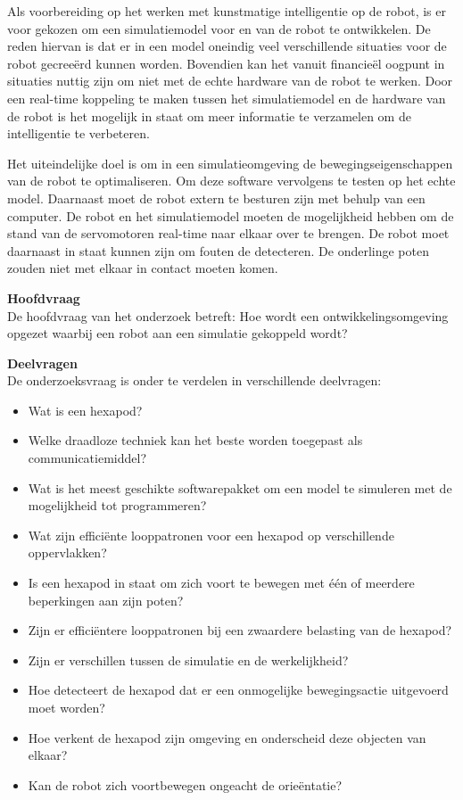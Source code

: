 \documentclass[10pt,a4paper]{article}
\begin{document}
Als voorbereiding op het werken met kunstmatige intelligentie op de robot, is er voor gekozen om een simulatiemodel voor en van de robot te ontwikkelen. De reden hiervan is dat er in een model oneindig veel verschillende situaties voor de robot gecree\"erd kunnen worden. Bovendien kan het vanuit financie\"el oogpunt in situaties nuttig zijn om niet met de echte hardware van de robot te werken. 
Door een real-time koppeling te maken tussen het simulatiemodel en de hardware van de robot is het mogelijk in staat om meer informatie te verzamelen om de intelligentie te verbeteren.

Het uiteindelijke doel is om in een simulatieomgeving de bewegingseigenschappen van de robot te optimaliseren. Om deze software vervolgens te testen op het echte model. Daarnaast moet de robot extern te besturen zijn met behulp van een computer. De robot en het simulatiemodel moeten de mogelijkheid hebben om de stand van de servomotoren real-time naar elkaar over te brengen. De robot moet daarnaast in staat kunnen zijn om fouten de detecteren. De onderlinge poten zouden niet met elkaar in contact moeten komen.

\textbf{Hoofdvraag\\}
De hoofdvraag van het onderzoek betreft:
Hoe wordt een ontwikkelingsomgeving opgezet waarbij een robot aan een simulatie gekoppeld wordt?

\textbf{Deelvragen\\}
De onderzoeksvraag is onder te verdelen in verschillende deelvragen:
\begin{itemize}
\setlength\itemsep{0em}
\item Wat is een hexapod?
\item Welke draadloze techniek kan het beste worden toegepast als communicatiemiddel?
\item Wat is het meest geschikte softwarepakket om een model te simuleren met de mogelijkheid tot programmeren?
\item Wat zijn effici\"ente looppatronen voor een hexapod op verschillende oppervlakken?
\item Is een hexapod in staat om zich voort te bewegen met één of meerdere beperkingen aan zijn poten?
\item Zijn er effici\"entere looppatronen bij een zwaardere belasting van de hexapod?
\item Zijn er verschillen tussen de simulatie en de werkelijkheid?
\item Hoe detecteert de hexapod dat er een onmogelijke bewegingsactie uitgevoerd moet worden?
\item Hoe verkent de hexapod zijn omgeving en onderscheid deze objecten van elkaar?
\item Kan de robot zich voortbewegen ongeacht de orie\"entatie?
\end{itemize}
\end{document}
